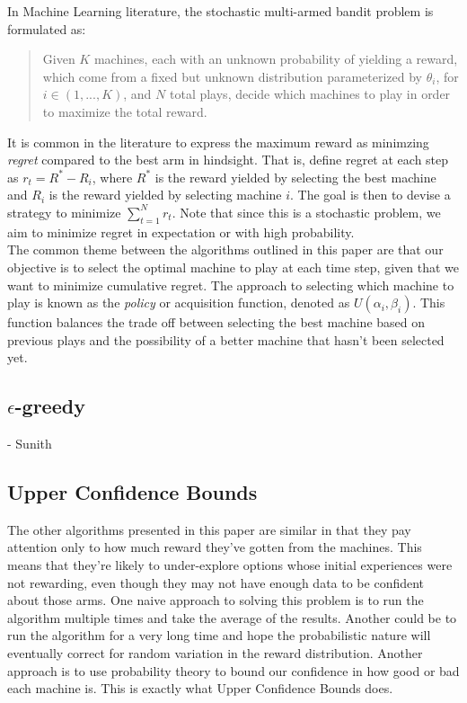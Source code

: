 \documentclass{article}
\begin{document}
In Machine Learning literature, the stochastic multi-armed bandit problem is formulated as:

\begin{quote}
Given $K$ machines, each with an unknown probability of yielding a reward, which come from a fixed but unknown distribution parameterized by $\theta_i$, for $i \in (1, ..., K)$, and $N$ total plays, decide which machines to play in order to maximize the total reward.
\end{quote}

It is common in the literature to express the maximum reward as minimzing \textit{regret} compared to the best arm in hindsight. That is, define regret at each step as $r_{t} = R^* - R_{i}$, where $R^*$ is the reward yielded by selecting the best machine and $R_{i}$ is the reward yielded by selecting machine $i$. The goal is then to devise a strategy to minimize $\sum_{t=1}^N r_{t}$. Note that since this is a stochastic problem, we aim to minimize regret in expectation or with high probability.\\

The common theme between the algorithms outlined in this paper are that our objective is to select the optimal machine to play at each time step, given that we want to minimize cumulative regret. The approach to selecting which machine to play is known as the \textit{policy} or acquisition function, denoted as $U(\alpha_i, \beta_i)$. This function balances the trade off between selecting the best machine based on previous plays and the possibility of a better machine that hasn't been selected yet.

\subsection{$\epsilon$-greedy}

- Sunith

\subsection{Upper Confidence Bounds}

The other algorithms presented in this paper are similar in that they pay attention only to how much reward they’ve gotten from the machines. This means that they're likely to under-explore options whose initial experiences were not rewarding, even though they may not have enough data to be confident about those arms. One naive approach to solving this problem is to run the algorithm multiple times and take the average of the results. Another could be to run the algorithm for a very long time and hope the probabilistic nature will eventually correct for random variation in the reward distribution. Another approach is to use probability theory to bound our confidence in how good or bad each machine is. This is exactly what Upper Confidence Bounds does.\\
\end{document}
